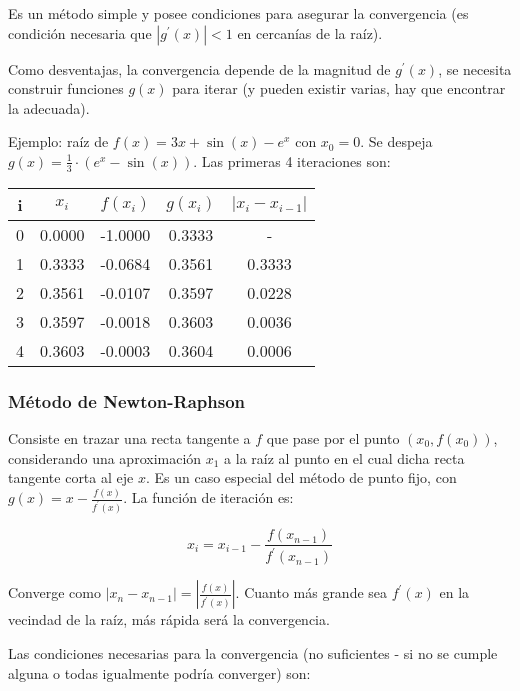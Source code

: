 \documentclass{article}
\begin{document}
Es un método simple y posee condiciones para asegurar la convergencia (es 
condición necesaria que $|g^\prime(x)|<1$ en cercanías de la raíz).

Como desventajas, la convergencia depende de la magnitud de $g^\prime(x)$, se 
necesita construir funciones $g(x)$ para iterar (y pueden existir varias, hay 
que encontrar la adecuada).

Ejemplo: raíz de $f(x) = 3x + \sin(x) - e^x$ con $x_0 = 0$.
Se despeja $g(x) = \frac{1}{3}\cdot(e^x-\sin(x))$. Las primeras 4 iteraciones 
son:

\begin{table}[h]
\centering
\begin{tabular}{ccccc}
    i & $x_i$  & $f(x_i)$ & $g(x_i)$ & $|x_i - x_{i-1}|$ \\\hline
    0 & 0.0000 & -1.0000  & 0.3333   & -                 \\
    1 & 0.3333 & -0.0684  & 0.3561   & 0.3333            \\
    2 & 0.3561 & -0.0107  & 0.3597   & 0.0228            \\
    3 & 0.3597 & -0.0018  & 0.3603   & 0.0036            \\
    4 & 0.3603 & -0.0003  & 0.3604   & 0.0006            \\
\end{tabular}
\end{table}

\subsubsection{Método de Newton-Raphson}

Consiste en trazar una recta tangente a $f$ que pase por el punto 
$(x_0, f(x_0))$, considerando una aproximación $x_1$ a la raíz al punto en el 
cual dicha recta tangente corta al eje $x$. Es un caso especial del método de
punto fijo, con $g(x) = x - \frac{f(x)}{f^\prime(x)}$. La función de iteración 
es:

\begin{equation*}
    x_i = x_{i-1} - \frac{f(x_{n-1})}{f^\prime(x_{n-1})}
\end{equation*}

Converge como $|x_n - x_{n-1}| = \left| \frac{f(x)}{f^\prime(x)} \right|$. 
Cuanto más grande sea $f^\prime(x)$ en la vecindad de la raíz, más rápida será
la convergencia.

Las condiciones necesarias para la convergencia (no suficientes - si no se 
cumple alguna o todas igualmente podría converger) son:
\end{document}
